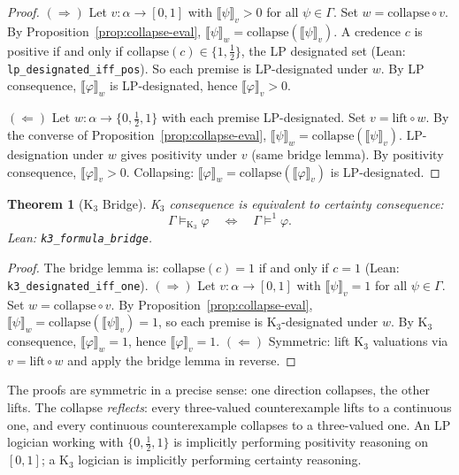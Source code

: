 \documentclass[11pt,a4paper]{article}
\newtheorem{theorem}{Theorem}[section]
\begin{document}
\begin{proof}
$(\Rightarrow)$
Let $v : \alpha \to [0,1]$ with $\llbracket\psi\rrbracket_v > 0$
for all $\psi \in \Gamma$.
Set $w = \mathrm{collapse} \circ v$.
By Proposition~\ref{prop:collapse-eval},
$\llbracket\psi\rrbracket_w = \mathrm{collapse}(
\llbracket\psi\rrbracket_v)$.
A credence $c$ is positive if and only if $\mathrm{collapse}(c)
\in \{1, \tfrac{1}{2}\}$, the LP designated set
(Lean: \texttt{lp\_designated\_iff\_pos}).
So each premise is LP-designated under $w$.
By LP consequence, $\llbracket\varphi\rrbracket_w$ is
LP-designated, hence $\llbracket\varphi\rrbracket_v > 0$.

$(\Leftarrow)$
Let $w : \alpha \to \{0, \tfrac{1}{2}, 1\}$ with each premise
LP-designated.
Set $v = \mathrm{lift} \circ w$.
By the converse of Proposition~\ref{prop:collapse-eval},
$\llbracket\psi\rrbracket_w = \mathrm{collapse}(
\llbracket\psi\rrbracket_v)$.
LP-designation under $w$ gives positivity under $v$
(same bridge lemma).
By positivity consequence, $\llbracket\varphi\rrbracket_v > 0$.
Collapsing: $\llbracket\varphi\rrbracket_w =
\mathrm{collapse}(\llbracket\varphi\rrbracket_v)$ is LP-designated.
\end{proof}

\begin{theorem}[K$_3$ Bridge]
\label{thm:k3-bridge}
K$_3$ consequence is equivalent to certainty consequence:
\[
\Gamma \models_{\mathrm{K}_3} \varphi
\quad \Longleftrightarrow \quad
\Gamma \models^1 \varphi.
\]
Lean: \texttt{k3\_formula\_bridge}.
\end{theorem}

\begin{proof}
The bridge lemma is: $\mathrm{collapse}(c) = 1$ if and only if
$c = 1$ (Lean: \texttt{k3\_designated\_iff\_one}).
$(\Rightarrow)$
Let $v : \alpha \to [0,1]$ with
$\llbracket\psi\rrbracket_v = 1$ for all $\psi \in \Gamma$.
Set $w = \mathrm{collapse} \circ v$.
By Proposition~\ref{prop:collapse-eval},
$\llbracket\psi\rrbracket_w = \mathrm{collapse}(
\llbracket\psi\rrbracket_v) = 1$, so each premise is
K$_3$-designated under $w$.
By K$_3$ consequence, $\llbracket\varphi\rrbracket_w = 1$,
hence $\llbracket\varphi\rrbracket_v = 1$.
$(\Leftarrow)$
Symmetric: lift K$_3$ valuations via
$v = \mathrm{lift} \circ w$ and apply the bridge lemma in reverse.
\end{proof}

The proofs are symmetric in a precise sense: one direction collapses,
the other lifts.
The collapse \emph{reflects}:
every three-valued counterexample lifts to a continuous one, and
every continuous counterexample collapses to a three-valued one.
An LP logician working with $\{0, \tfrac{1}{2}, 1\}$ is implicitly
performing positivity reasoning on $[0,1]$; a K$_3$ logician is
implicitly performing certainty reasoning.
\end{document}
